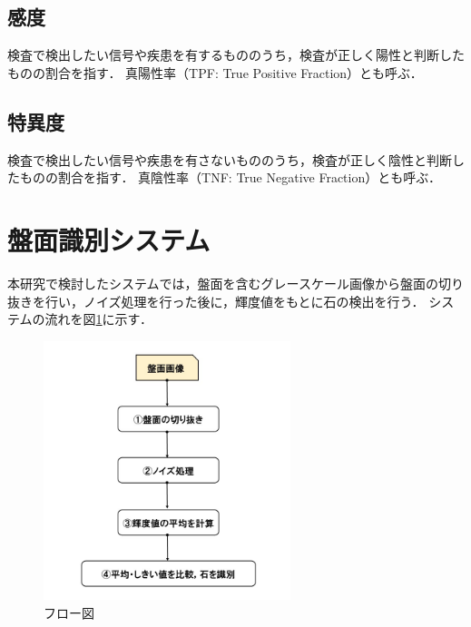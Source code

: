 \documentclass[openright]{nitocs}
\numberwithin{equation}{section}
\begin{document}
        \subsection{感度} %
        検査で検出したい信号や疾患を有するもののうち，検査が正しく陽性と判断したものの割合を指す．
        真陽性率（TPF: True Positive Fraction）とも呼ぶ．

        \subsection{特異度} %
        検査で検出したい信号や疾患を有さないもののうち，検査が正しく陰性と判断したものの割合を指す．
        真陰性率（TNF: True Negative Fraction）とも呼ぶ．

    \section{盤面識別システム} %
        本研究で検討したシステムでは，盤面を含むグレースケール画像から盤面の切り抜きを行い，ノイズ処理を行った後に，輝度値をもとに石の検出を行う．
        システムの流れを図\ref{flow}に示す．
        \begin{figure} %
            \begin{center}
            \includegraphics[width=72mm,height=75.6mm]{flow.jpg} 
            \caption{フロー図}
            \label{flow}
            \end{center}
        \end{figure}
\end{document}
